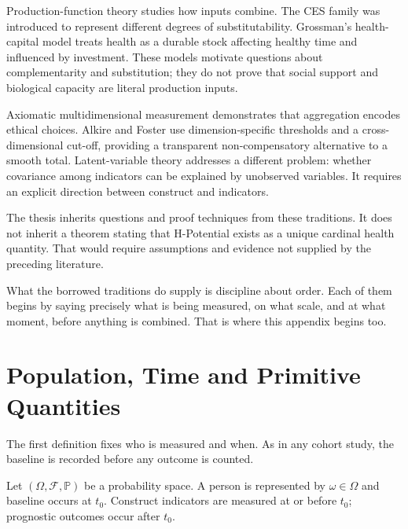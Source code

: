 Production-function theory studies how inputs combine. The CES family was
introduced to represent different degrees of substitutability.
\citep{arrow_chenery_1961} Grossman's health-capital model treats health as a
durable stock affecting healthy time and influenced by investment.
\citep{grossman_1972} These models motivate questions about complementarity and
substitution; they do not prove that social support and biological capacity are
literal production inputs.

Axiomatic multidimensional measurement demonstrates that aggregation encodes
ethical choices. Alkire and Foster use dimension-specific thresholds and a
cross-dimensional cut-off, providing a transparent non-compensatory alternative
to a smooth total. \citep{alkire_foster_2011} Latent-variable theory addresses a
different problem: whether covariance among indicators can be explained by
unobserved variables. It requires an explicit direction between construct and
indicators. \citep{bollen_lennox_1991,jarvis_2003}

\begin{remark}
The thesis inherits questions and proof techniques from these traditions. It
does not inherit a theorem stating that H-Potential exists as a unique cardinal
health quantity. That would require assumptions and evidence not supplied by
the preceding literature.
\end{remark}

What the borrowed traditions do supply is discipline about order. Each of them
begins by saying precisely what is being measured, on what scale, and at what
moment, before anything is combined. That is where this appendix begins too.

\section{Population, Time and Primitive Quantities}
\label{app:a-primitives}

The first definition fixes who is measured and when. As in any cohort study,
the baseline is recorded before any outcome is counted.

\begin{definition}
Let $(\Omega,\mathcal F,\mathbb P)$ be a probability space. A person is
represented by $\omega\in\Omega$ and baseline occurs at $t_0$. Construct
indicators are measured at or before $t_0$; prognostic outcomes occur after
$t_0$.
\end{definition}

